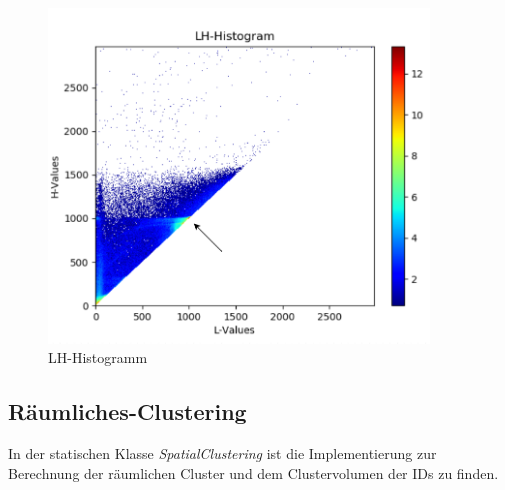 \begin{figure}[H] 
\includegraphics[width=0.9\textwidth]{Logos/LHHistogram_a.png}
\caption{LH-Histogramm} 
\label{fig:lh_histo} 
\end{figure}


\subsection{Räumliches-Clustering}

In der statischen Klasse \textit{SpatialClustering} ist die Implementierung zur Berechnung der räumlichen Cluster und dem Clustervolumen der IDs zu finden.


